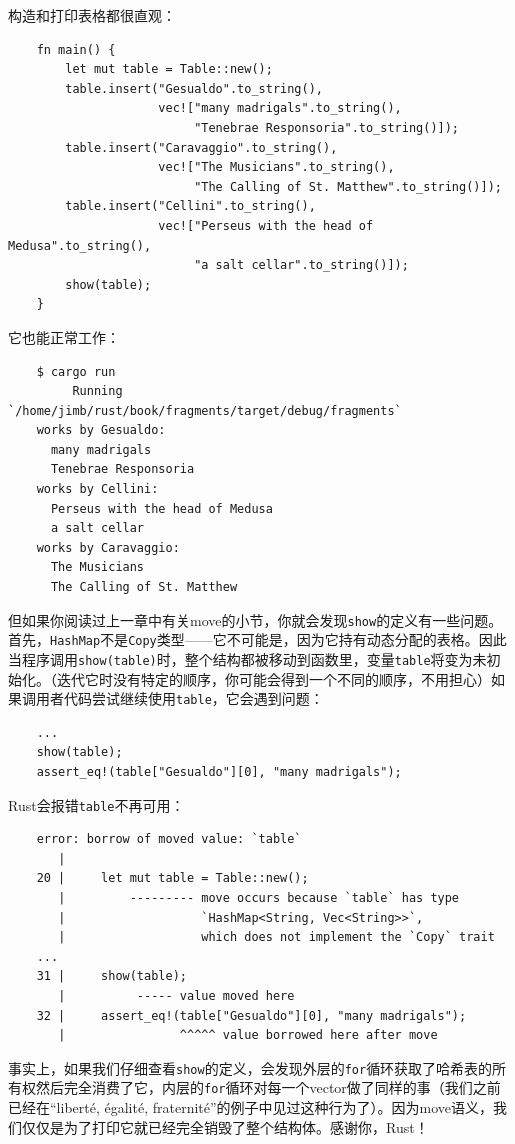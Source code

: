 构造和打印表格都很直观：
\begin{verbatim}
    fn main() {
        let mut table = Table::new();
        table.insert("Gesualdo".to_string(),
                     vec!["many madrigals".to_string(),
                          "Tenebrae Responsoria".to_string()]);
        table.insert("Caravaggio".to_string(),
                     vec!["The Musicians".to_string(),
                          "The Calling of St. Matthew".to_string()]);
        table.insert("Cellini".to_string(),
                     vec!["Perseus with the head of Medusa".to_string(),
                          "a salt cellar".to_string()]);
        show(table);
    }
\end{verbatim}

它也能正常工作：
\begin{verbatim}
    $ cargo run
         Running `/home/jimb/rust/book/fragments/target/debug/fragments`
    works by Gesualdo:
      many madrigals
      Tenebrae Responsoria
    works by Cellini:
      Perseus with the head of Medusa
      a salt cellar
    works by Caravaggio:
      The Musicians
      The Calling of St. Matthew
\end{verbatim}

但如果你阅读过上一章中有关move的小节，你就会发现\texttt{show}的定义有一些问题。首先，\texttt{HashMap}不是\texttt{Copy}类型——它不可能是，因为它持有动态分配的表格。因此当程序调用\texttt{show(table)}时，整个结构都被移动到函数里，变量\texttt{table}将变为未初始化。（迭代它时没有特定的顺序，你可能会得到一个不同的顺序，不用担心）如果调用者代码尝试继续使用\texttt{table}，它会遇到问题：
\begin{verbatim}
    ...
    show(table);
    assert_eq!(table["Gesualdo"][0], "many madrigals");
\end{verbatim}

Rust会报错\texttt{table}不再可用：
\begin{verbatim}
    error: borrow of moved value: `table`
       |
    20 |     let mut table = Table::new();
       |         --------- move occurs because `table` has type
       |                   `HashMap<String, Vec<String>>`,
       |                   which does not implement the `Copy` trait
    ...
    31 |     show(table);
       |          ----- value moved here
    32 |     assert_eq!(table["Gesualdo"][0], "many madrigals");
       |                ^^^^^ value borrowed here after move
\end{verbatim}

事实上，如果我们仔细查看\texttt{show}的定义，会发现外层的\texttt{for}循环获取了哈希表的所有权然后完全消费了它，内层的\texttt{for}循环对每一个vector做了同样的事（我们之前已经在“liberté, égalité, fraternité”的例子中见过这种行为了）。因为move语义，我们仅仅是为了打印它就已经完全销毁了整个结构体。感谢你，Rust！

